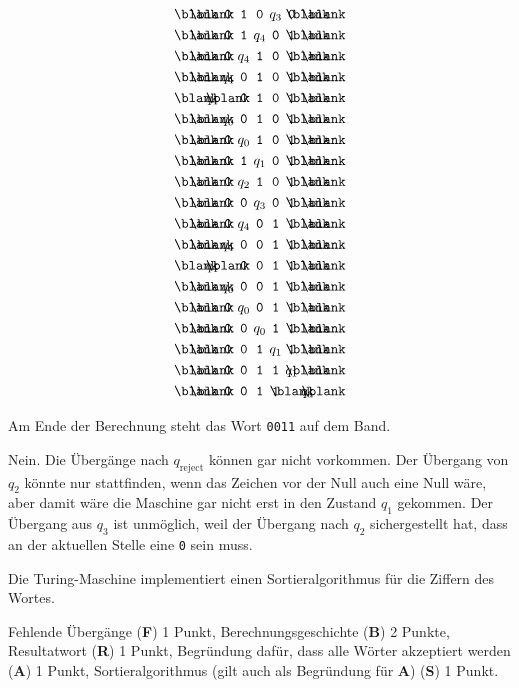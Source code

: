 \begin{loesung}
\begin{teilaufgaben}
\begin{align*}
&\zb   \zb     \zt{0}  \zt{1}  \zt{0}  \z{q_3} \zt{0}  \zb     \zb\\
&\zb   \zb     \zt{0}  \zt{1}  \z{q_4} \zt{0}  \zt{1}  \zb     \zb\\
&\zb   \zb     \zt{0}  \z{q_4} \zt{1}  \zt{0}  \zt{1}  \zb     \zb\\
&\zb   \zb     \z{q_4} \zt{0}  \zt{1}  \zt{0}  \zt{1}  \zb     \zb\\
&\zb   \z{q_4} \zb     \zt{0}  \zt{1}  \zt{0}  \zt{1}  \zb     \zb\\
&\zb   \zb     \z{q_0} \zt{0}  \zt{1}  \zt{0}  \zt{1}  \zb     \zb\\
&\zb   \zb     \zt{0}  \z{q_0} \zt{1}  \zt{0}  \zt{1}  \zb     \zb\\
&\zb   \zb     \zt{0}  \zt{1}  \z{q_1} \zt{0}  \zt{1}  \zb     \zb\\
&\zb   \zb     \zt{0}  \z{q_2} \zt{1}  \zt{0}  \zt{1}  \zb     \zb\\
&\zb   \zb     \zt{0}  \zt{0}  \z{q_3} \zt{0}  \zt{1}  \zb     \zb\\
&\zb   \zb     \zt{0}  \z{q_4} \zt{0}  \zt{1}  \zt{1}  \zb     \zb\\
&\zb   \zb     \z{q_4} \zt{0}  \zt{0}  \zt{1}  \zt{1}  \zb     \zb\\
&\zb   \z{q_4} \zb     \zt{0}  \zt{0}  \zt{1}  \zt{1}  \zb     \zb\\
&\zb   \zb     \z{q_0} \zt{0}  \zt{0}  \zt{1}  \zt{1}  \zb     \zb\\
&\zb   \zb     \zt{0}  \z{q_0} \zt{0}  \zt{1}  \zt{1}  \zb     \zb\\
&\zb   \zb     \zt{0}  \zt{0}  \z{q_0} \zt{1}  \zt{1}  \zb     \zb\\
&\zb   \zb     \zt{0}  \zt{0}  \zt{1}  \z{q_1} \zt{1}  \zb     \zb\\
&\zb   \zb     \zt{0}  \zt{0}  \zt{1}  \zt{1}  \z{q_1} \zb     \zb\\
&\zb   \zb     \zt{0}  \zt{0}  \zt{1}  \zt{1}  \zb     \z{q_a} \zb\\
\end{align*}
\item
Am Ende der Berechnung steht das Wort \texttt{0011} auf dem Band.
\item
Nein.
Die Übergänge nach $q_{\text{reject}}$ können gar nicht vorkommen.
Der Übergang von $q_2$ könnte nur stattfinden, wenn das Zeichen vor
der Null auch eine Null wäre, aber damit wäre die Maschine gar nicht
erst in den Zustand $q_1$ gekommen.
Der Übergang aus $q_3$ ist unmöglich, weil der Übergang nach $q_2$
sichergestellt hat, dass an der aktuellen Stelle eine \texttt{0}
sein muss.
\item
Die Turing-Maschine implementiert einen Sortieralgorithmus für die
Ziffern des Wortes.
\qedhere
\end{teilaufgaben}
\end{loesung}

\begin{bewertung}
Fehlende Übergänge ({\bf F}) 1 Punkt,
Berechnungsgeschichte ({\bf B}) 2 Punkte,
Resultatwort ({\bf R}) 1 Punkt,
Begründung dafür, dass alle Wörter akzeptiert werden ({\bf A}) 1 Punkt,
Sortieralgorithmus (gilt auch als Begründung für {\bf A}) ({\bf S}) 1 Punkt.
\end{bewertung}
